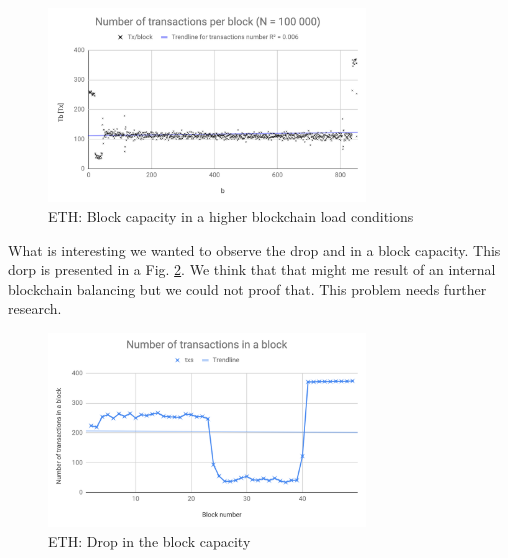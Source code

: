 \begin{figure}[!h]
    \centering
    \includegraphics[width=0.75\textwidth]{img/txmed.png}
   \caption{ETH: Block capacity in a higher blockchain load conditions}
   \label{fig:txbig}
\end{figure}
 
What is interesting we wanted to observe the drop and in a block capacity. This dorp is presented in a Fig. \ref{fig:txsmall}. We think that that might me result of an internal blockchain balancing but we could not proof that. This problem needs further research.
 
\begin{figure}[!h]
    \centering
    \includegraphics[width=0.75\textwidth]{img/TxNumperBlockSmall.png}
   \caption{ETH: Drop in the block capacity}
   \label{fig:txsmall}
\end{figure}
